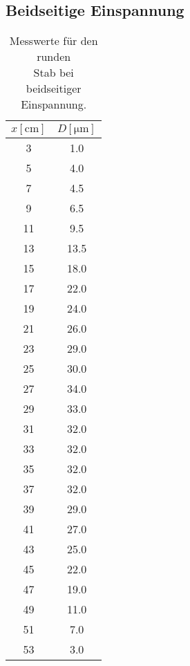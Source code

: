 \subsection{Beidseitige Einspannung}
\begin{table}
    \begin{minipage}{0.48\linewidth}
        \centering
        \caption{Messwerte für den runden \\Stab bei beidseitiger Einspannung.}
        \label{tab:Beidseitige_Einspannung_rund}
        \begin{tabular}[h!]{|c|c|}
            \toprule
            {$x\left[\unit{\centi\meter}\right]$} & {$D\left[\unit{\micro\meter}\right]$}\\
            \midrule
            3& 1.0\\
            5& 4.0\\
            7& 4.5\\
            9& 6.5\\
            11& 9.5\\
            13& 13.5\\
            15& 18.0\\
            17& 22.0\\
            19& 24.0\\
            21& 26.0\\
            23& 29.0\\
            25& 30.0\\
            \hline
            27& 34.0\\
            29& 33.0\\
            31& 32.0\\
            33& 32.0\\
            35& 32.0\\
            37& 32.0\\
            39& 29.0\\
            41& 27.0\\
            43& 25.0\\
            45& 22.0\\
            47& 19.0\\
            49& 11.0\\
            51& 7.0\\
            53& 3.0\\
            \bottomrule
        \end{tabular}
    \end{minipage}
    \begin{minipage}{0.48\linewidth}

\end{minipage}
\end{table}
